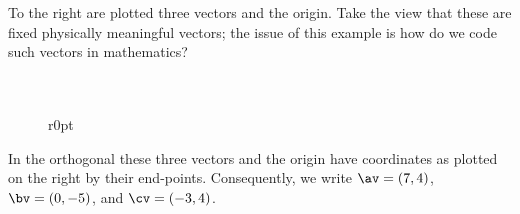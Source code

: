 \begin{example} 
To the right are plotted three vectors and the origin.
Take the view that these are fixed physically meaningful vectors; the issue of this example is how do we code such vectors in mathematics?
\\\ \\\ 

\begin{wrapfigure}r{0pt}
\end{wrapfigure}
In the orthogonal  these three vectors and the origin have coordinates as plotted on the right by their end-points.
Consequently, we write \(\av=(7,4)\), \(\bv=(0,-5)\), and \(\cv=(-3,4)\).
\\\ \\\ \\\ \\\


\end{example}
